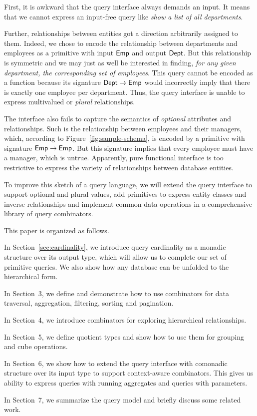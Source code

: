 First, it is awkward that the query interface always demands an input.  It
means that we cannot express an input-free query like \emph{show a list of all
departments}.

Further, relationships between entities got a direction arbitrarily assigned to
them.  Indeed, we chose to encode the relationship between departments and
employees as a primitive with input $\textup{\textsf{Emp}}$ and output $\textup{\textsf{Dept}}$.  But this
relationship is symmetric and we may just as well be interested in finding,
\emph{for any given department, the corresponding set of employees}.  This
query cannot be encoded as a function because its signature $\textup{\textsf{Dept}} \to \textup{\textsf{Emp}}$
would incorrectly imply that there is exactly one employee per department.
Thus, the query interface is unable to express multivalued or \emph{plural}
relationships.

The interface also fails to capture the semantics of \emph{optional} attributes
and relationships.  Such is the relationship between employees and their
managers, which, according to Figure~\ref{fig:sample-schema}, is encoded by a
primitive with signature $\textup{\textsf{Emp}} \to \textup{\textsf{Emp}}$.  But this signature implies that
every employee must have a manager, which is untrue.  Apparently, pure
functional interface is too restrictive to express the variety of relationships
between database entities.

To improve this sketch of a query language, we will extend the query interface
to support optional and plural values, add primitives to express entity classes
and inverse relationships and implement common data operations in a
comprehensive library of query combinators.

This paper is organized as follows.

In Section~\ref{sec:cardinality}, we introduce query cardinality as a mo\-nadic
structure over its output type, which will allow us to complete our set of
primitive queries.  We also show how any database can be unfolded to the
hierarchical form.

In Section~3, we define and demonstrate how to use combinators for data
traversal, aggregation, filtering, sorting and pagination.

In Section~4, we introduce combinators for exploring hierarchical
relationships.

In Section~5, we define quotient types and show how to use them for grouping
and cube operations.

In Section~6, we show how to extend the query interface with comonadic
structure over its input type to support context-aware combinators.  This gives
us ability to express queries with running aggregates and queries with
parameters.

In Section~7, we summarize the query model and briefly discuss some related
work.

